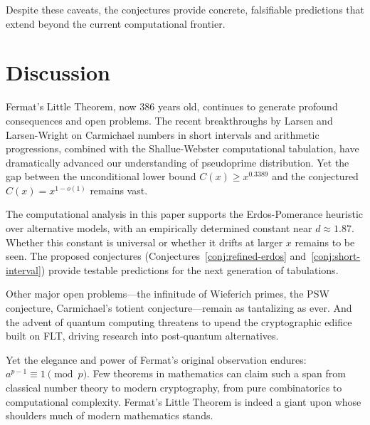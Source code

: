 \documentclass{amsart}
\theoremstyle{plain}
\theoremstyle{definition}
\theoremstyle{remark}
\begin{document}
Despite these caveats, the conjectures provide concrete, falsifiable predictions that extend beyond the current computational frontier.

\section{Discussion}

Fermat's Little Theorem, now 386 years old, continues to generate profound consequences and open problems. The recent breakthroughs by Larsen and Larsen-Wright on Carmichael numbers in short intervals and arithmetic progressions, combined with the Shallue-Webster computational tabulation, have dramatically advanced our understanding of pseudoprime distribution. Yet the gap between the unconditional lower bound $C(x) \ge x^{0.3389}$ and the conjectured $C(x) = x^{1-o(1)}$ remains vast.

The computational analysis in this paper supports the Erdos-Pomerance heuristic over alternative models, with an empirically determined constant near $d \approx 1.87$. Whether this constant is universal or whether it drifts at larger $x$ remains to be seen. The proposed conjectures (Conjectures~\ref{conj:refined-erdos} and~\ref{conj:short-interval}) provide testable predictions for the next generation of tabulations.

Other major open problems---the infinitude of Wieferich primes, the PSW conjecture, Carmichael's totient conjecture---remain as tantalizing as ever. And the advent of quantum computing threatens to upend the cryptographic edifice built on FLT, driving research into post-quantum alternatives.

Yet the elegance and power of Fermat's original observation endures: $a^{p-1} \equiv 1 \pmod{p}$. Few theorems in mathematics can claim such a span from classical number theory to modern cryptography, from pure combinatorics to computational complexity. Fermat's Little Theorem is indeed a giant upon whose shoulders much of modern mathematics stands.



\end{document}
